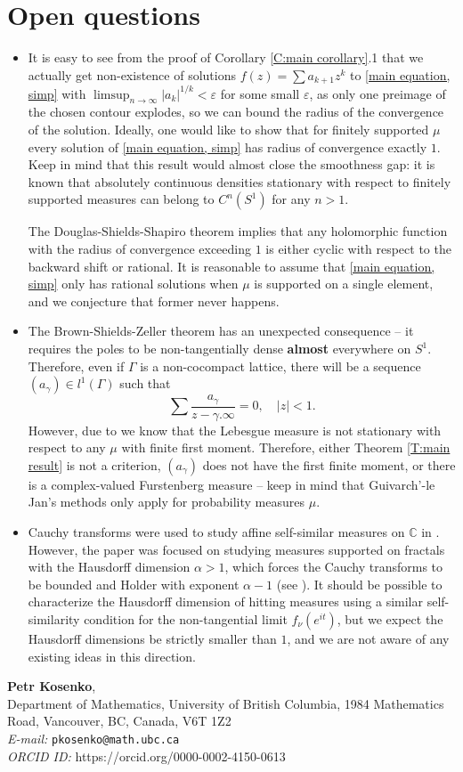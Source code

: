 \documentclass[11pt]{article}
\makeatletter
\newcommand{\Addresses}{{%
		\bigskip
		\footnotesize
		\noindent
		\textbf{Petr Kosenko}, \\
		Department of Mathematics, University of British Columbia, 1984 Mathematics Road, Vancouver, BC, Canada, V6T 1Z2 \\	
		\textit{E-mail:} \texttt{pkosenko@math.ubc.ca} \\
		\textit{ORCID ID:} https://orcid.org/0000-0002-4150-0613
}}
\makeatother
\begin{document}
\section{Open questions}
\begin{itemize}
	\item It is easy to see from the proof of Corollary \ref{C:main corollary}.1 that we actually get non-existence of solutions $f(z) = \sum a_{k+1} z^k$ to \eqref{main equation, simp} with $\limsup_{n \rightarrow \infty} |a_k|^{1/k} < \varepsilon$ for some small $\varepsilon$, as only one preimage of the chosen contour explodes, so we can bound the radius of the convergence of the solution. Ideally, one would like to show that for finitely supported $\mu$ every solution of \eqref{main equation, simp} has radius of convergence exactly $1$. Keep in mind that this result would almost close the smoothness gap: it is known that absolutely continuous densities stationary with respect to finitely supported measures can belong to $C^n(S^1)$ for any $n > 1$. 
	
	The Douglas-Shields-Shapiro theorem implies that any holomorphic function with the radius of convergence exceeding $1$ is either cyclic with respect to the backward shift or rational. It is reasonable to assume that \eqref{main equation, simp} only has rational solutions when $\mu$ is supported on a single element, and we conjecture that former never happens.
	\item The Brown-Shields-Zeller theorem has an unexpected consequence -- it requires the poles to be non-tangentially dense \textbf{almost} everywhere on $S^1$. Therefore, even if $\Gamma$ is a non-cocompact lattice, there will be a sequence $(a_\gamma) \in l^1(\Gamma)$ such that
	\[
	\sum \frac{a_\gamma}{z - \gamma.\infty} = 0, \quad |z| < 1.
	\]
	However, due to \cite{guivarch1990} we know that the Lebesgue measure is not stationary with respect to any $\mu$ with finite first moment. Therefore, either Theorem \ref{T:main result} is not a criterion, $(a_\gamma)$ does not have the first finite moment, or there is a complex-valued Furstenberg measure -- keep in mind that Guivarch'-le Jan's methods only apply for probability measures $\mu$.
	\item Cauchy transforms were used to study affine self-similar measures on $\mathbb{C}$ in \cite{lund1998cauchy}. However, the paper was focused on studying measures supported on fractals with the Hausdorff dimension $\alpha> 1$, which forces the Cauchy transforms to be bounded and Holder with exponent $\alpha - 1$ (see \cite[Theorem 2.1(b)]{lund1998cauchy}). It should be possible to characterize the Hausdorff dimension of hitting measures using a similar self-similarity condition for the non-tangential limit $f_\nu(e^{it})$, but we expect the Hausdorff dimensions be strictly smaller than $1$, and we are not aware of any existing ideas in this direction.
\end{itemize}

\printbibliography
\Addresses
\end{document}
